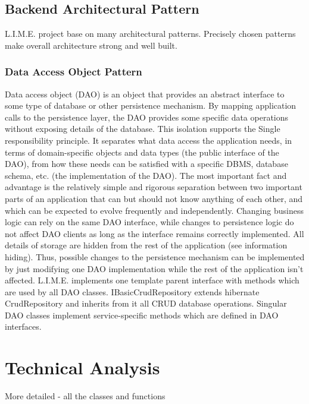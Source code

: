 \documentclass[a4paper,11pt,twoside]{report}
\theoremstyle{definition}
\begin{document}
\section{Backend Architectural Pattern}

L.I.M.E. project base on many architectural patterns. Precisely chosen patterns make overall architecture strong and well built. 
\subsection{Data Access Object Pattern}

Data access object (DAO) is an object that provides an abstract interface to some type of database or other persistence mechanism. By mapping application calls to the persistence layer, the DAO provides some specific data operations without exposing details of the database. This isolation supports the Single responsibility principle. It separates what data access the application needs, in terms of domain-specific objects and data types (the public interface of the DAO), from how these needs can be satisfied with a specific DBMS, database schema, etc. (the implementation of the DAO).
	The most important fact and advantage is the relatively simple and rigorous separation between two important parts of an application that can but should not know anything of each other, and which can be expected to evolve frequently and independently. Changing business logic can rely on the same DAO interface, while changes to persistence logic do not affect DAO clients as long as the interface remains correctly implemented. All details of storage are hidden from the rest of the application (see information hiding). Thus, possible changes to the persistence mechanism can be implemented by just modifying one DAO implementation while the rest of the application isn't affected.
L.I.M.E. implements one template parent interface with methods which are used by all DAO classes. IBasicCrudRepository extends hibernate CrudRepository and inherits from it all CRUD database operations. Singular DAO classes implement service-specific methods which are defined in DAO interfaces.



\chapter{Technical Analysis}

More detailed - all the classes and functions
\end{document}
